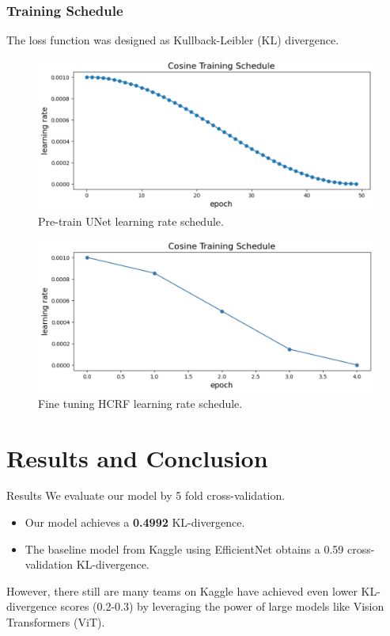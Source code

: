 \documentclass[leqno]{beamer}
\begin{document}
\begin{frame}
\frametitle{Training Schedule}
The loss function was designed as Kullback-Leibler (KL) divergence.
\begin{figure}[tbp]
\centering
\includegraphics[width=.55\textwidth]{pretrain}
\vspace{-.3em}
\caption{Pre-train UNet learning rate schedule.}
\end{figure}
\vspace{-1.2em}
\begin{figure}[tbp]
\centering
\includegraphics[width=.55\textwidth]{finetune}
\vspace{-.3em}
\caption{Fine tuning HCRF learning rate schedule.}
\end{figure}
\end{frame}



\section{Results and Conclusion}


\begin{frame}{Results}
We evaluate our model by 5 fold cross-validation.
\bigskip
\begin{itemize}
\item Our model achieves a \textbf{0.4992} KL-divergence.
\bigskip
\item The baseline model from Kaggle using EfficientNet obtains a 0.59
cross-validation KL-divergence.
\end{itemize}
\bigskip
However, there still are many teams on Kaggle have achieved even lower
KL-divergence scores (0.2-0.3) by leveraging the power of large models
like Vision Transformers (ViT).
\end{frame}
\end{document}
